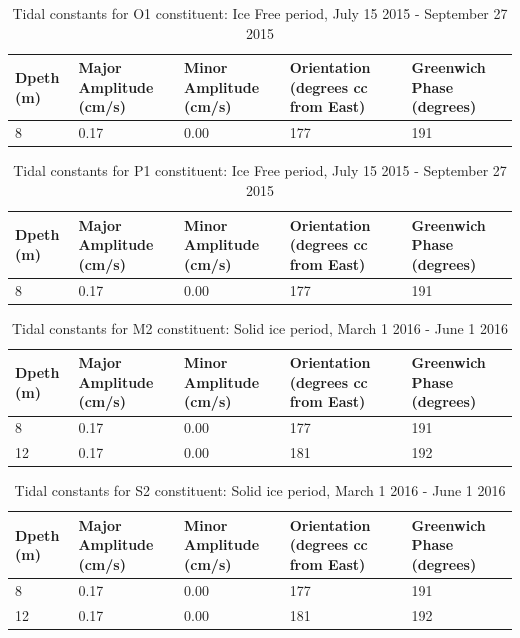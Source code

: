 \documentclass[12pt]{dforeport}
\begin{document}
\begin{table}[ht]
\centering
\caption[Tidal Constituents, O1, Ice Free, 2015]{Tidal constants for O1 constituent: Ice Free period, July 15 2015 - September 27 2015} 
\label{t:o1_if_2015}
\begin{tabular}{p{0.3in}p{.7in}p{.7in}p{.7in}p{.7in}}
 Dpeth (m) & Major Amplitude (cm/s) & Minor Amplitude (cm/s) & Orientation (degrees cc from East) & Greenwich Phase (degrees) \\ 
  \hline
8 & 0.17 & 0.00 & 177 & 191 \\
   \hline
\end{tabular}
\end{table}

\begin{table}[ht]
\centering
\caption[Tidal Constituents, P1, Ice Free, 2015]{Tidal constants for P1 constituent: Ice Free period, July 15 2015 - September 27 2015} 
\label{t:p1_if_2015}
\begin{tabular}{p{0.3in}p{.7in}p{.7in}p{.7in}p{.7in}}
 Dpeth (m) & Major Amplitude (cm/s) & Minor Amplitude (cm/s) & Orientation (degrees cc from East) & Greenwich Phase (degrees) \\ 
  \hline
8 & 0.17 & 0.00 & 177 & 191 \\
   \hline
\end{tabular}
\end{table}



\clearpage

\begin{table}[ht]
\centering
\caption[Tidal Constituents, M2, Solid Ice, 2015]{Tidal constants for M2 constituent: Solid ice period, March 1 2016 - June 1 2016} 
\label{t:m2_si_2015}
\begin{tabular}{p{0.3in}p{.7in}p{.7in}p{.7in}p{.7in}}
 Dpeth (m) & Major Amplitude (cm/s) & Minor Amplitude (cm/s) & Orientation (degrees cc from East) & Greenwich Phase (degrees) \\ 
  \hline
8 & 0.17 & 0.00 & 177 & 191 \\
12 & 0.17 & 0.00 & 181 & 192 \\
   \hline
\end{tabular}
\end{table}


\begin{table}[ht]
\centering
\caption[Tidal Constituents, S2, Solid Ice, 2015]{Tidal constants for S2 constituent: Solid ice period, March 1 2016 - June 1 2016} 
\label{t:s2_si_2015}
\begin{tabular}{p{0.3in}p{.7in}p{.7in}p{.7in}p{.7in}}
 Dpeth (m) & Major Amplitude (cm/s) & Minor Amplitude (cm/s) & Orientation (degrees cc from East) & Greenwich Phase (degrees) \\ 
  \hline
8 & 0.17 & 0.00 & 177 & 191 \\
12 & 0.17 & 0.00 & 181 & 192 \\
   \hline
\end{tabular}
\end{table}
\end{document}
